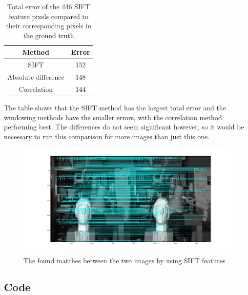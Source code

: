 \documentclass{article}
\begin{document}
\begin{table}[!ht]
 \centering
 \caption{Total error of the 446 SIFT feature pixels compared to their corresponding pixels in the ground truth}
 \begin{tabular}{c|c}
 Method & Error \\
 \hline
 SIFT & 152 \\
 Absolute difference & 148 \\
 Correlation & 144
 \end{tabular}
 \label{table2}
\end{table}
The table shows that the SIFT method has the largest total error and the windowing methods have the smaller errors, with the correlation method performing best. The differences do not seem significant however, so it would be necessary to run this comparison for more images than just this one. 

\begin{figure}[ht!]
 \centering
 \includegraphics[width = \linewidth]{matches.png}
 \caption{The found matches between the two images by using SIFT features}
 \label{matches}
\end{figure}

\begin{appendices}
\section{Code}






\end{appendices}
\end{document}
